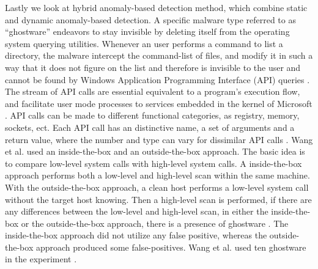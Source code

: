 \documentclass[12pt]{article} %
\begin{document}
Lastly we look at hybrid anomaly-based detection method, which combine static and dynamic anomaly-based detection. A specific malware type referred to as “ghostware” endeavors to stay invisible by deleting itself from the operating system querying utilities. Whenever an user performs a command to list a directory, the malware intercept the command-list of files, and modify it in such a way that it does not figure on the list and therefore is invisible to the user and cannot be found by Windows Application Programming Interface  (API) queries \cite{idika2007survey}. The  stream of API calls are essential equivalent to a program’s execution flow, and facilitate user mode processes to services embedded in the kernel of Microsoft \cite{ahmed2009using}. API calls can be made to different functional categories, as registry, memory, sockets, ect. Each API call has an distinctive name, a set of arguments and a return value, where the number and type can vary for dissimilar API calls \cite{ahmed2009using}. Wang et al. \cite{idika2007survey} used an inside-the-box and  an outside-the-box approach. The basic idea is to compare low-level system calls with high-level system calls. A inside-the-box approach performs both a low-level and high-level scan  within the same machine. With the outside-the-box approach, a clean host performs a low-level system call without the target host knowing. Then a high-level scan is performed, if there are any differences between the low-level and high-level scan, in either the inside-the-box or the outside-the-box approach, there is a presence of ghostware \cite{idika2007survey}. The inside-the-box approach did not utilize any false positive, whereas  the outside-the-box approach produced some false-positives. Wang et al. \cite{idika2007survey} used ten ghostware in the experiment \cite{idika2007survey}.
\\
\end{document}
